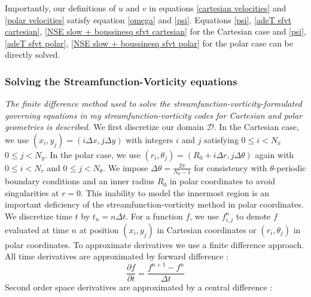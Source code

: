 \documentclass{article}
\begin{document}
\noindent Importantly, our definitions of $u$ and $v$ in equations \ref{cartesian velocities} and \ref{polar velocities} satisfy equation \ref{omega} and \ref{psi}. Equations \ref{psi}, \ref{adeT sfvt cartesian}, \ref{NSE slow + boussinesq sfvt cartesian} for the Cartesian case and \ref{psi}, \ref{adeT sfvt polar}, \ref{NSE slow + boussinesq sfvt polar} for the polar case can be directly solved.

\subsubsection*{Solving the Streamfunction-Vorticity equations}
{\it{The finite difference method used to solve the streamfunction-vorticity-formulated governing equations in my streamfunction-vorticity codes for Cartesian and polar geometries is described. }}
\vspace{0.3cm}
\newline
\noindent We first discretize our domain $\mathcal{D}$. In the Cartesian case, we use $(x_i,y_j)=(i \Delta x, j \Delta y)
$ with integers $i$ and $j$ satisfying $0\leq i < N_x$ $0 \leq j < N_y$. In the polar case, we use $(r_i, \theta_j)= (R_0 
+ i \Delta r, j 
\Delta \theta)$ again with  $0 \leq i < N_r$ and $0 \leq j < N_{\theta}$. We impose $\Delta \theta = \frac{2 \pi}
{N_{\theta} - 1}$ for consistency with $\theta$-periodic boundary conditions and an inner radius $R_0$ in polar 
coordinates to avoid 
singularities at $r=0$. This inability to model the innermost region is an important deficiency of the streamfunction-vorticity method in polar coordinates. We discretize time $t$ by $t_n = n \Delta t$. For a function $f$, we use 
$f^n_{i,j}$ to denote $f$ evaluated at time $n$ at position $(x_i,y_j)$ in Cartesian coordinates or $(r_i, \theta_j)$ in 
polar coordinates. 
\newline
To approximate derivatives we use a finite difference approach. All time derivatives are approximated by forward difference \cite{press1986numerical}:
\begin{equation}
	\frac{\partial f}{\partial t} = \frac{f^{n+1} - f^{n}}{\Delta t}
	\label{forward time difference}
\end{equation}
Second order space derivatives are approximated by a central difference \cite{press1986numerical}:
\end{document}
